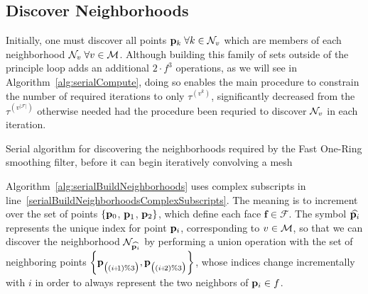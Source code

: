 \subsection{Discover Neighborhoods}
Initially, one must discover all points $\mathbf{p}_k \; \forall k \in \mathcal{N}_v$ which are members of each neighborhood $\mathcal{N}_v \; \forall v \in \mathcal{M}$. Although building this family of sets outside of the principle loop adds an additional $2\cdot f^3$ operations, as we will see in Algorithm~\ref{alg:serialCompute}, doing so enables the main procedure to constrain the number of required iterations to only $\tau^{(v^k)}$, significantly decreased from the $\tau^{(v^{|\mathcal{F}|})}$ otherwise needed had the procedure been requried to discover $\mathcal{N}_v$ in each iteration.
%
\begin{algorithm}
	\DontPrintSemicolon


	\bigskip
	\;
\nl	{}
	\caption{Serial algorithm for discovering the neighborhoods required by the Fast One-Ring smoothing filter, before it can begin iteratively convolving a mesh\label{alg:serialBuildNeighborhoods}}
\end{algorithm}%
%
%
%
%

Algorithm~\ref{alg:serialBuildNeighborhoods} uses complex subscripts in line~\ref{serialBuildNeighborhoodsComplexSubscripts}. The meaning is to increment over the set of points $\{\mathbf{p}_0$, $\mathbf{p}_1$, $\mathbf{p}_2\}$, which define each face $\mathbf{f} \in \mathcal{F}$. The symbol $\widehat{\mathbf{p}_i}$ represents the unique index for point $\mathbf{p}_i$, corresponding to $v \in \mathcal{M}$, so that we can discover the neighborhood $\mathcal{N}_{\widehat{\mathbf{p}_i}}$ by performing a union operation with the set of neighboring points $\left \{\bp_{\big((\sipo)\%3\big)}, \bp_{\big((\sipt)\%3\big)}\right \}$, whose indices change incrementally with $i$ in order to always represent the two neighbors of $\mathbf{p}_i \in f$.
%
